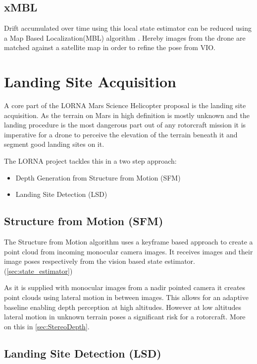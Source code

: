 \subsection{xMBL}

Drift accumulated over time using this local state estimator can be reduced using a Map Based Localization(MBL) algorithm \citep{XMBL}. Hereby images from the drone are matched against a satellite map in order to refine the pose from VIO.


\section{Landing Site Acquisition }

A core part of the LORNA Mars Science Helicopter proposal is the landing site acquisition. As the terrain on Mars in high definition is mostly unknown and the landing procedure is the most dangerous part out of any rotorcraft mission it is imperative for a drone to perceive the elevation of the terrain beneath it and segment good landing sites on it.

The LORNA project tackles this in a two step approach:

\begin{itemize}
    \item Depth Generation from Structure from Motion (SFM) \citep{SFM}
    \item Landing Site Detection (LSD) \citep{LSD1, LSD2}
\end{itemize}

\subsection{Structure from Motion (SFM)}\label{subsec:related_work:SFM}

The Structure from Motion algorithm \citep{SFM} uses a keyframe based approach to create a point cloud from incoming monocular camera images. It receives images and their image poses respectively from the vision based state estimator. (\ref{sec:state_estimator})

As it is supplied with monocular images from a nadir pointed camera it creates point clouds using lateral motion in between images. This allows for an adaptive baseline enabling depth perception at high altitudes. However at low altitudes lateral motion in unknown terrain poses a significant risk for a rotorcraft. More on this in \cref{sec:StereoDepth}.

\subsection{Landing Site Detection (LSD)}\label{subsec:related_work:LSD}

